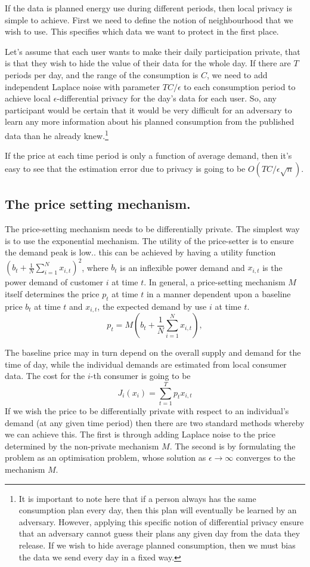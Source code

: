 \documentclass[a4paper,onecolumn]{article}
\numberwithin{algorithm}{section}
\theoremstyle{plain}
\theoremstyle{definition}
\theoremstyle{example}
\newcommand{\eps}{\epsilon}
\newcommand{\demand}{x}
\newcommand{\price}{p}
\newcommand{\cost}{J}
\newcommand{\nmech}{M}
\newcommand{\baseline}{b}
\begin{document}
If the data is planned energy use during different periods, then local privacy is simple to achieve. First we need to define the notion of neighbourhood that we wish to use. This specifies which data we want to protect in the first place.

Let's assume that each user wants to make their daily participation
private, that is that they wish to hide the value of their data for
the whole day. If there are $T$ periods per day, and the range of the
consumption is $C$, we need to add independent Laplace noise with
parameter $TC / \epsilon$ to each consumption period to achieve local
$\epsilon$-differential privacy for the day's data for each user. So,
any participant would be certain that it would be very difficult for
an adversary to learn any more information about his planned
consumption from the published data than he already knew.\footnote{It
  is important to note here that if a person always has the same
  consumption plan every day, then this plan will eventually be
  learned by an adversary. However, applying this specific notion of
  differential privacy ensure that an adversary cannot guess their
  plans any given day from the data they release. If we wish to hide
  average planned consumption, then we must bias the data we send
  every day in a fixed way.}

If the price at each time period is only a function of average demand,
then it's easy to see that the estimation error due to privacy is
going to be $O(TC / \epsilon \sqrt{n})$.


\subsection{The price setting mechanism.}
The price-setting mechanism needs to be differentially private. The simplest way is to use the exponential mechanism. The utility of the price-setter is to ensure the demand peak is low.. this can be achieved by having a utility function $\left(\baseline_t + \frac{1}{N}\sum_{i=1}^N \demand_{i,t}\right)^2$, where $\baseline_t$ is an inflexible power demand and $\demand_{i,t}$ is the power demand of customer $i$ at time $t$. 
In general, a price-setting mechanism $\nmech$ itself determines the price $\price_t$ at time $t$ in a manner dependent upon a baseline price $\baseline_t$ at time $t$ and $\demand_{i,t}$, the expected demand by use $i$ at time $t$.
\[
\price_t = \nmech\left(\baseline_t + \frac{1}{N}\sum_{i=1}^N \demand_{i,t}\right),
\]


The baseline price may in turn depend on the overall supply and demand
for the time of day, while the individual demands are estimated from
local consumer data.  The cost for the $i$-th consumer is going to be
\[
\cost_i(\demand_i) = \sum_{t=1}^T \price_t \demand_{i,t}
\]
If we wish the price to be differentially private with respect to an individual's demand (at any given time period) then there are two standard methods whereby we can achieve this. The first is through adding Laplace noise to the price determined by the non-private mechanism $\nmech$. The second is by formulating the problem as an optimisation problem, whose solution as $\eps \to \infty$ converges to the mechanism $\nmech$.
\end{document}
